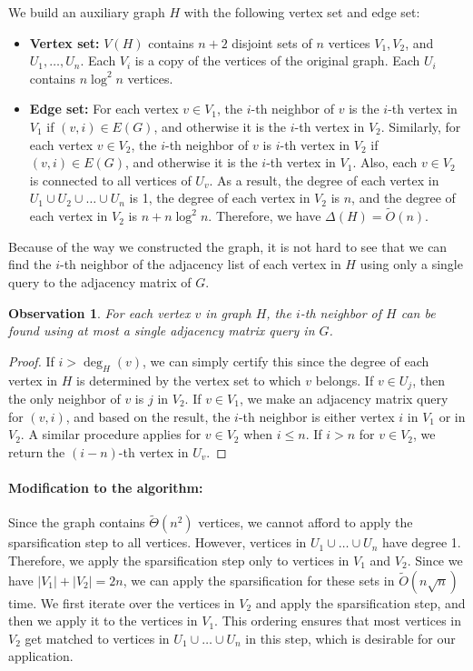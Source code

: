 \documentclass[letterpaper,11pt]{article}
\newcommand{\wt}[1]{\ensuremath{\widetilde{#1}}}
\newtheorem{observation}[lemma]{Observation}
\begin{document}
We build an auxiliary graph $H$ with the following vertex set and edge set:
\begin{itemize}
    \item \textbf{Vertex set:} $V(H)$ contains $n+2$ disjoint sets of $n$ vertices $V_1, V_2$, and $U_1, \ldots, U_n$. Each $V_i$ is a copy of the vertices of the original graph. Each $U_i$ contains $n \log^2 n$ vertices.
    \item \textbf{Edge set:} For each vertex $v \in V_1$, the $i$-th neighbor of $v$ is the $i$-th vertex in $V_1$ if $(v, i) \in E(G)$, and otherwise it is the $i$-th vertex in $V_2$. Similarly, for each vertex $v \in V_2$, the $i$-th neighbor of $v$ is $i$-th vertex in $V_2$ if $(v, i) \in E(G)$, and otherwise it is the $i$-th vertex in $V_1$. Also, each $v \in V_2$ is connected to all vertices of $U_v$. As a result, the degree of each vertex in $U_1 \cup U_2 \cup \ldots \cup U_n$ is 1, the degree of each vertex in $V_2$ is $n$, and the degree of each vertex in $V_2$ is $n + n\log^2 n$. Therefore, we have $\Delta(H) = \wt{O}(n)$.
\end{itemize}

Because of the way we constructed the graph, it is not hard to see that we can find the $i$-th neighbor of the adjacency list of each vertex in $H$ using only a single query to the adjacency matrix of $G$.


\begin{observation}
    For each vertex $v$ in graph $H$, the $i$-th neighbor of $H$ can be found using at most a single adjacency matrix query in $G$.
\end{observation}
\begin{proof}
    If $i > \deg_H(v)$, we can simply certify this since the degree of each vertex in $H$ is determined by the vertex set to which $v$ belongs. If $v \in U_j$, then the only neighbor of $v$ is $j$ in $V_2$. If $v \in V_1$, we make an adjacency matrix query for $(v, i)$, and based on the result, the $i$-th neighbor is either vertex $i$ in $V_1$ or in $V_2$. A similar procedure applies for $v \in V_2$ when $i \leq n$. If $i > n$ for $v \in V_2$, we return the $(i - n)$-th vertex in $U_v$.  
\end{proof}

\paragraph{Modification to the algorithm:} Since the graph contains $\wt{\Theta}(n^2)$ vertices, we cannot afford to apply the sparsification step to all vertices. However, vertices in $U_1 \cup \ldots \cup U_n$ have degree 1. Therefore, we apply the sparsification step only to vertices in $V_1$ and $V_2$. Since we have $|V_1| + |V_2| = 2n$, we can apply the sparsification for these sets in $\wt{O}(n\sqrt{n})$ time. We first iterate over the vertices in $V_2$ and apply the sparsification step, and then we apply it to the vertices in $V_1$. This ordering ensures that most vertices in $V_2$ get matched to vertices in $U_1 \cup \ldots \cup U_n$ in this step, which is desirable for our application.
\end{document}
